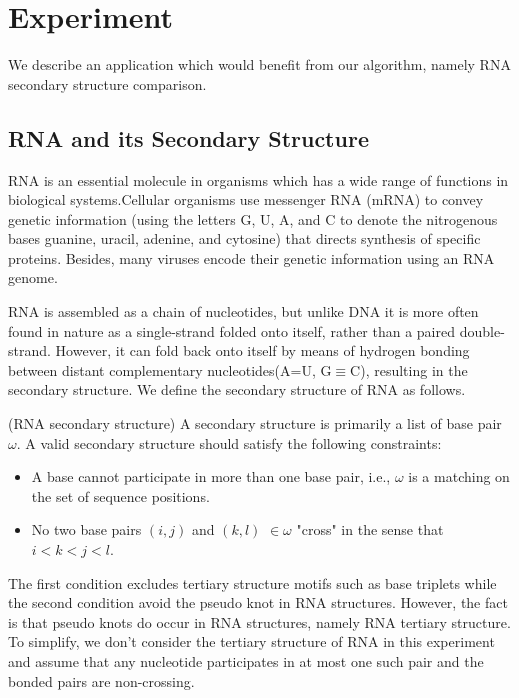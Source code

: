\doublespacing
\chapter{Experiment}
We describe an application which would benefit from our algorithm, namely RNA secondary structure comparison. 

\section{RNA and its Secondary Structure}
RNA is an essential molecule in organisms which has a wide range of functions in biological systems.Cellular organisms use messenger RNA (mRNA) to convey genetic information (using the letters G, U, A, and C to denote the nitrogenous bases guanine, uracil, adenine, and cytosine) that directs synthesis of specific proteins. Besides, many viruses encode their genetic information using an RNA genome.

RNA is assembled as a chain of nucleotides, but unlike DNA it is more often found in nature as a single-strand folded onto itself, rather than a paired double-strand. However, it can fold back onto itself by means of hydrogen bonding between distant complementary nucleotides(A=U, G$\equiv$C), resulting in the secondary structure. We define the secondary structure of RNA as follows.

\begin{definition}
(RNA secondary structure) A secondary structure is primarily a list of base pair $\omega$. A valid secondary structure should satisfy the following constraints:
\begin{itemize}
\item A base cannot participate in more than one base pair, i.e., $\omega$ is a matching on the set of sequence positions.
\item No two base pairs $(i, j)$ and $(k, l)$ $\in \omega$ "cross" in the sense that $i < k < j < l$.
\end{itemize}
\end{definition}

The first condition excludes tertiary structure motifs such as base triplets while the second condition avoid the pseudo knot in RNA structures. However, the fact is that pseudo knots do occur in RNA structures, namely RNA tertiary structure. To simplify, we don't consider the tertiary structure of RNA in this experiment and assume that any nucleotide participates in at most one such pair and the bonded pairs are non-crossing. 

